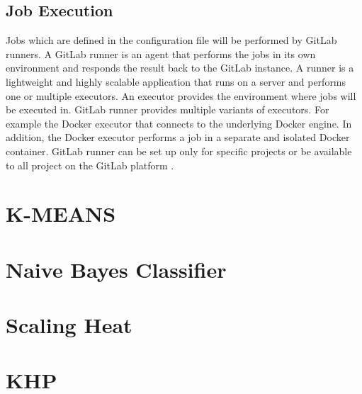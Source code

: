\subsection{Job Execution}
Jobs which are defined in the configuration file will be performed by GitLab runners.
A GitLab runner is an agent that performs the jobs in its own environment and responds the result back to the GitLab instance. A runner is a lightweight and highly scalable application that runs on a server and performs one or multiple executors.
An executor provides the environment where jobs will be executed in. GitLab runner provides multiple variants of executors.
For example the Docker executor that connects to the underlying Docker engine. In addition, the Docker executor performs a job in a separate and isolated Docker container.
GitLab runner can be set up only for specific projects or be available to all project on the GitLab platform \cite{Gitlab2020Docs}.


\section{K-MEANS}


\section{Naive Bayes Classifier}


\section{Scaling Heat}


\section{KHP}